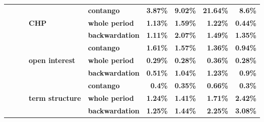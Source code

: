 \documentclass[
  authoryear,
  preprint,
  3p]{elsarticle}
\begin{document}
\begin{longtable}[t]{>{}l>{}l>{}l>{}l>{}l>{}r>{}r>{}r>{}r}
\textbf{} & \textbf{} & \textbf{} & \textbf{} & \textbf{contango} & \textcolor[HTML]{4285f4}{\textbf{3.87\%}} & \textcolor[HTML]{4285f4}{\textbf{9.02\%}} & \textcolor[HTML]{4285f4}{\textbf{21.64\%}} & \textcolor[HTML]{4285f4}{\textbf{8.6\%}}\\
\textbf{} & \textbf{} & \textbf{} & \textbf{CHP} & \textbf{whole period} & \textcolor[HTML]{4285f4}{\textbf{1.13\%}} & \textcolor[HTML]{4285f4}{\textbf{1.59\%}} & \textcolor[HTML]{4285f4}{\textbf{1.22\%}} & \textcolor[HTML]{4285f4}{\textbf{0.44\%}}\\
\textbf{} & \textbf{} & \textbf{} & \textbf{} & \textbf{backwardation} & \textcolor[HTML]{4285f4}{\textbf{1.11\%}} & \textcolor[HTML]{4285f4}{\textbf{2.07\%}} & \textcolor[HTML]{4285f4}{\textbf{1.49\%}} & \textcolor[HTML]{4285f4}{\textbf{1.35\%}}\\
\addlinespace
\textbf{} & \textbf{} & \textbf{} & \textbf{} & \textbf{contango} & \textcolor[HTML]{4285f4}{\textbf{1.61\%}} & \textcolor[HTML]{4285f4}{\textbf{1.57\%}} & \textcolor[HTML]{4285f4}{\textbf{1.36\%}} & \textcolor[HTML]{4285f4}{\textbf{0.94\%}}\\
\textbf{} & \textbf{} & \textbf{} & \textbf{open interest} & \textbf{whole period} & \textcolor[HTML]{4285f4}{\textbf{0.29\%}} & \textcolor[HTML]{4285f4}{\textbf{0.28\%}} & \textcolor[HTML]{4285f4}{\textbf{0.36\%}} & \textcolor[HTML]{4285f4}{\textbf{0.28\%}}\\
\textbf{} & \textbf{} & \textbf{} & \textbf{} & \textbf{backwardation} & \textcolor[HTML]{4285f4}{\textbf{0.51\%}} & \textcolor[HTML]{4285f4}{\textbf{1.04\%}} & \textcolor[HTML]{4285f4}{\textbf{1.23\%}} & \textcolor[HTML]{4285f4}{\textbf{0.9\%}}\\
\textbf{} & \textbf{} & \textbf{} & \textbf{} & \textbf{contango} & \textcolor[HTML]{4285f4}{\textbf{0.4\%}} & \textcolor[HTML]{4285f4}{\textbf{0.35\%}} & \textcolor[HTML]{4285f4}{\textbf{0.66\%}} & \textcolor[HTML]{4285f4}{\textbf{0.3\%}}\\
\textbf{} & \textbf{} & \textbf{} & \textbf{term structure} & \textbf{whole period} & \textcolor[HTML]{4285f4}{\textbf{1.24\%}} & \textcolor[HTML]{4285f4}{\textbf{1.41\%}} & \textcolor[HTML]{4285f4}{\textbf{1.71\%}} & \textcolor[HTML]{4285f4}{\textbf{2.42\%}}\\
\addlinespace
\textbf{} & \textbf{} & \textbf{} & \textbf{} & \textbf{backwardation} & \textcolor[HTML]{4285f4}{\textbf{1.25\%}} & \textcolor[HTML]{4285f4}{\textbf{1.44\%}} & \textcolor[HTML]{4285f4}{\textbf{2.25\%}} & \textcolor[HTML]{4285f4}{\textbf{3.08\%}}\\

\end{longtable}
\end{document}
